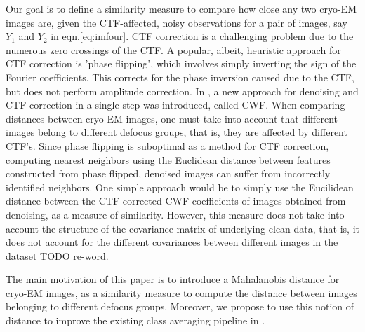 \documentclass{article}
\begin{document}
Our goal is to define a similarity measure to compare how close any two cryo-EM images are, given the CTF-affected, noisy observations for a pair of images, say $Y_1$ and $Y_2$ in eqn.\ref{eq:imfour}.
CTF correction is a challenging problem due to the numerous zero crossings of the CTF. A popular, albeit, heuristic approach for CTF correction is 'phase flipping', which involves simply inverting the sign of the Fourier coefficients. This corrects for the phase inversion caused due to the CTF, but does not perform amplitude correction. In \cite{cwf}, a new approach for denoising and CTF correction in a single step was introduced, called CWF. When comparing distances between cryo-EM images, one must take into account that different images belong to different defocus groups, that is, they are affected by different CTF's. Since phase flipping is suboptimal as a method for CTF correction, computing nearest neighbors using the Euclidean distance between features constructed from phase flipped, denoised images can suffer from incorrectly identified neighbors. One simple approach would be to simply use the Eucilidean distance between the CTF-corrected CWF coefficients of images obtained from denoising, as a measure of similarity. However, this measure does not take into account the structure of the covariance matrix of underlying clean data, that is, it does not account for the different covariances between different images in the dataset {\color{red} TODO re-word}.

The main motivation of this paper is to introduce a Mahalanobis distance for cryo-EM images, as a similarity measure to compute the distance between images belonging to different defocus groups. Moreover, we propose to use this notion of distance to improve the existing class averaging pipeline in \cite{zhao}.
\end{document}
